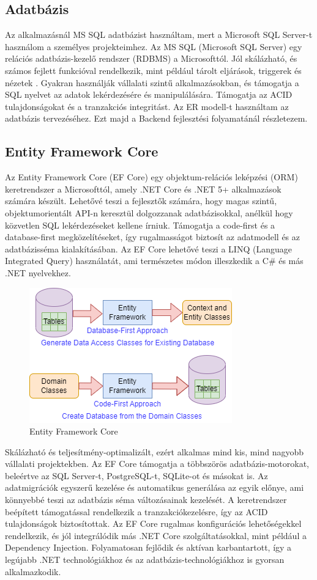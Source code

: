 \subsection*{Adatbázis}
Az alkalmazásnál MS SQL adatbázist használtam, mert a Microsoft SQL Server-t használom a személyes projekteimhez.
Az MS SQL (Microsoft SQL Server) egy relációs adatbázis-kezelő rendszer (RDBMS) a Microsofttól. Jól skálázható, és számos fejlett funkcióval rendelkezik,
mint például tárolt eljárások,
triggerek és nézetek
. Gyakran használják vállalati szintű alkalmazásokban,
és támogatja a SQL nyelvet az adatok lekérdezésére és manipulálására.
Támogatja az ACID tulajdonságokat és a tranzakciós integritást.
Az ER modell-t használtam az adatbázis tervezéséhez.
Ezt majd a Backend fejlesztési folyamatánál részletezem.

\subsection*{Entity Framework Core}
Az Entity Framework Core (EF Core) egy objektum-relációs leképzési (ORM) keretrendszer a Microsofttól,
amely .NET Core és .NET 5+ alkalmazások számára készült.
Lehetővé teszi a fejlesztők számára, hogy magas szintű,
objektumorientált API-n keresztül dolgozzanak adatbázisokkal,
anélkül hogy közvetlen SQL lekérdezéseket kellene írniuk.
Támogatja a code-first és a database-first megközelítéseket,
így rugalmasságot biztosít az adatmodell és az adatbázisséma kialakításában. Az EF Core lehetővé teszi a LINQ (Language Integrated Query) használatát,
ami természetes módon illeszkedik a C\# és más .NET nyelvekhez.

\begin{figure}[H]
    \centering
    \includegraphics[width=10.0truecm]{images/EntityFramework.png}
    \caption{Entity Framework Core}
    \label{fig:entity_framework_core}
\end{figure}

Skálázható és teljesítmény-optimalizált, ezért alkalmas mind kis,
mind nagyobb vállalati projektekben. Az EF Core támogatja a többszörös adatbázis-motorokat, beleértve az SQL Server-t, PostgreSQL-t, SQLite-ot és másokat is.
Az adatmigrációk egyszerű kezelése és automatikus generálása az egyik előnye, ami könnyebbé teszi az adatbázis séma változásainak kezelését.
A keretrendszer beépített támogatással rendelkezik a tranzakciókezelésre, így az ACID tulajdonságok biztosítottak. Az EF Core rugalmas konfigurációs lehetőségekkel rendelkezik,
és jól integrálódik más .NET Core szolgáltatásokkal, mint például a Dependency Injection. Folyamatosan fejlődik és aktívan karbantartott,
így a legújabb .NET technológiákhoz és az adatbázis-technológiákhoz is gyorsan alkalmazkodik.

